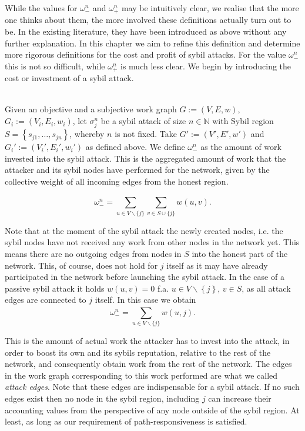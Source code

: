 \noindent{}While the values for $\omega^n_{-}$ and $\omega^n_{+}$ may be intuitively clear, we realise that the more one thinks about them, the more involved these definitions actually turn out to be. In the existing literature, they have been introduced as above without any further explanation. In this chapter we aim to refine this definition and determine more rigorous definitions for the cost and profit of sybil attacks. For the value $\omega^n_{-}$ this is not so difficult, while $\omega^n_{+}$ is much less clear. We begin by introducing the cost or investment of a sybil attack. \vspace{1em}\\

\begin{definition}\ \\
\label{def:Sybil Attack Cost}
\noindent{}Given an objective and a subjective work graph $G:=(V,E,w)$, $G_i:=(V_i,E_i,w_i)$, let $\sigma_j^n$ be a sybil attack of size $n\in\mathbb{N}$ with Sybil region $S=\left\lbrace{}s_{j1},\ldots,s_{jn}\right\rbrace$, whereby $n$ is not fixed. Take $G':=(V',E',w')$ and $G_i':=(V_i',E_i',w_i')$ as defined above. We define $\omega_{-}^{n}$ as the amount of work invested into the sybil attack. This is the aggregated amount of work that the attacker and its sybil nodes have performed for the network, given by the collective weight of all incoming edges from the honest region. 

\[
\omega_{-}^{n} = \sum\limits_{u\in{}V\backslash\lbrace{}j\rbrace}^{}\sum\limits_{v\in{S}\cup\{j\}}w(u,v).
\]

\noindent{}Note that at the moment of the sybil attack the newly created nodes, i.e. the sybil nodes have not received any work from other nodes in the network yet. This means there are no outgoing edges from nodes in $S$ into the honest part of the network. This, of course, does not hold for $j$ itself as it may have already participated in the network before launching the sybil attack. In the case of a passive sybil attack it holds $w(u,v)=0$ f.a. $u\in{}V\backslash{}\left\lbrace{}j\right\rbrace$, $v\in{}S$, as all attack edges are connected to $j$ itself. In this case we obtain \vspace{1em}\\
\[
\omega_{-}^{n} = \sum\limits_{u\in{}V\backslash\lbrace{}j\rbrace}^{}w(u,j).
\]
\end{definition}

\noindent{}This is the amount of actual work the attacker has to invest into the attack, in order to boost its own and its sybils reputation, relative to the rest of the network, and consequently obtain work from the rest of the network. The edges in the work graph corresponding to this work performed are what we called {\it attack edges}. Note that these edges are indispensable for a sybil attack. If no such edges exist then no node in the sybil region, including $j$ can increase their accounting values from the perspective of any node outside of the sybil region. At least, as long as our requirement of path-responsiveness is satisfied.  \vspace{1em}\\

